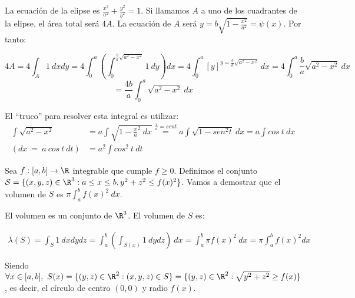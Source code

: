 \begin{ejemplo}

La ecuación de la elipse es $\frac{x^2}{a^2} + \frac{y^2}{b^2} = 1$. Si llamamos
$A$ a uno de los cuadrantes de la elipse, el área total será $4A$. La ecuación
de $A$ será $y = b \sqrt{1 - \frac{x^2}{a^2}} = \psi(x)$. Por tanto:

$$4A = 4\int_A 1 \ dxdy = 4\int_{0}^{a}\left(\int_0^{\frac{b}{a}\sqrt{a^2-x^2}}
  1 \ dy \right) dx = 4 \int_0^{a}\left[y\right]^{y = \frac{b}{a}\sqrt{a^2-x^2}}
\ dx = 4 \int_0^{a} \frac{b}{a}\sqrt{a^2-x^2} \ dx$$
$$= \frac{4b}{a} \int_0^{a}\sqrt{a^2-x^2} \ dx$$

El ``truco'' para resolver esta integral es utilizar:
\begin{align*}
 \int \sqrt{a^2-x^2} &= a\int \sqrt{1 - \frac{x}{a}^2 \ dx} \overset{\frac{x}{a}
    = sen t}{=} a\int \sqrt{1 - sen^2 t} \ dx = a\int cos \ t \ dx \\
                    (dx \ = \ a \ cos \ t \ dt)   &= a^2\int cos^2 \ t \ dt
\end{align*}
\end{ejemplo}

\begin{ejemplo}
  Sea $f : [a, b] \rightarrow \R$ integrable que cumple $f \geq 0$. Definimos el
  conjunto $\mathcal S = \{ (x, y, z) \in \R^3 : a \leq x \leq b, y^2+z^2 \leq
  f(x)^2 \}$. Vamos a demostrar que el volumen de $S$ es $\pi \int_a^b f(x)^2 \
  dx$.

  El volumen es un conjunto de $\R^3$. El volumen de $S$ es:

  \begin{align*}
    \lambda(S) = \int_S 1 \ dxdydz = \int_a^b \left( \int_{S(x)} 1  \ dydz \right)
    \ dx = \int_a^b \pi f(x)^2 \ dx = \pi \int_a^b f(x)^2dx
  \end{align*}

  Siendo $\forall x \in [a, b], \ S(x) = \{ (y, z) \in \R^2 : (x, y, z) \in S \} = \{ (y,z) \in \R^2 :
  \sqrt{y^2+z^2} \geq f(x) \}$, es decir, el círculo de centro $(0,0)$ y radio $f(x)$.
\end{ejemplo}

